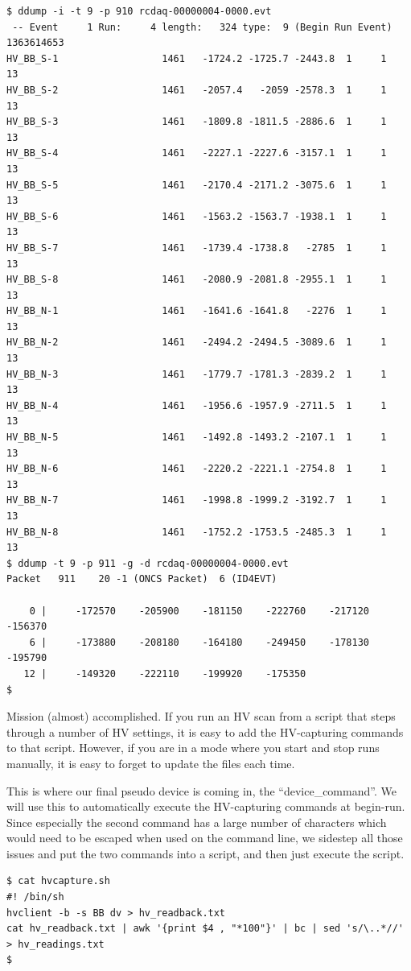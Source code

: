 \documentclass{article}[11pt]
\begin{document}
\begin{verbatim}
$ ddump -i -t 9 -p 910 rcdaq-00000004-0000.evt
 -- Event     1 Run:     4 length:   324 type:  9 (Begin Run Event)  1363614653
HV_BB_S-1                  1461   -1724.2 -1725.7 -2443.8  1     1    13
HV_BB_S-2                  1461   -2057.4   -2059 -2578.3  1     1    13
HV_BB_S-3                  1461   -1809.8 -1811.5 -2886.6  1     1    13
HV_BB_S-4                  1461   -2227.1 -2227.6 -3157.1  1     1    13
HV_BB_S-5                  1461   -2170.4 -2171.2 -3075.6  1     1    13
HV_BB_S-6                  1461   -1563.2 -1563.7 -1938.1  1     1    13
HV_BB_S-7                  1461   -1739.4 -1738.8   -2785  1     1    13
HV_BB_S-8                  1461   -2080.9 -2081.8 -2955.1  1     1    13
HV_BB_N-1                  1461   -1641.6 -1641.8   -2276  1     1    13
HV_BB_N-2                  1461   -2494.2 -2494.5 -3089.6  1     1    13
HV_BB_N-3                  1461   -1779.7 -1781.3 -2839.2  1     1    13
HV_BB_N-4                  1461   -1956.6 -1957.9 -2711.5  1     1    13
HV_BB_N-5                  1461   -1492.8 -1493.2 -2107.1  1     1    13
HV_BB_N-6                  1461   -2220.2 -2221.1 -2754.8  1     1    13
HV_BB_N-7                  1461   -1998.8 -1999.2 -3192.7  1     1    13
HV_BB_N-8                  1461   -1752.2 -1753.5 -2485.3  1     1    13
$ ddump -t 9 -p 911 -g -d rcdaq-00000004-0000.evt
Packet   911    20 -1 (ONCS Packet)  6 (ID4EVT)

    0 |     -172570    -205900    -181150    -222760    -217120    -156370 
    6 |     -173880    -208180    -164180    -249450    -178130    -195790 
   12 |     -149320    -222110    -199920    -175350 
$ 
\end{verbatim}

Mission (almost) accomplished. If you run an HV scan from a script
that steps through a number of HV settings, it is easy to add the
HV-capturing commands to that script.  However, if you are in a mode
where you start and stop runs manually, it is easy to forget to update
the files each time.

This is where our final pseudo device is coming in, the
``device\_command''. We will use this to automatically execute the
HV-capturing commands at begin-run. Since especially the second
command has a large number of characters which would need to be
escaped when used on the command line, we sidestep all those issues
and put the two commands into a script, and then just execute the
script.

\begin{verbatim}
$ cat hvcapture.sh
#! /bin/sh
hvclient -b -s BB dv > hv_readback.txt
cat hv_readback.txt | awk '{print $4 , "*100"}' | bc | sed 's/\..*//' > hv_readings.txt
$ 
\end{verbatim}
\end{document}
